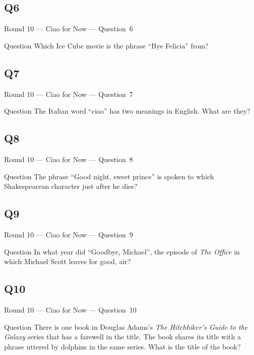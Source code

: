 \documentclass[11pt]{beamer}
\begin{document}
\subsection*{Q6}
\begin{frame}[t]{Round 10 --- Ciao for Now --- \mbox{Question 6}}
\vspace{-0.5em}
\begin{block}{Question}
Which Ice Cube movie is the phrase ``Bye Felicia'' from?
\end{block}
\end{frame}
\subsection*{Q7}
\begin{frame}[t]{Round 10 --- Ciao for Now --- \mbox{Question 7}}
\vspace{-0.5em}
\begin{block}{Question}
The Italian word ``ciao'' has two meanings in English. What are they? 
\end{block}
\end{frame}
\subsection*{Q8}
\begin{frame}[t]{Round 10 --- Ciao for Now --- \mbox{Question 8}}
\vspace{-0.5em}
\begin{block}{Question}
The phrase ``Good night, sweet prince'' is spoken to which Shakespearean character just after he dies?
\end{block}
\end{frame}
\subsection*{Q9}
\begin{frame}[t]{Round 10 --- Ciao for Now --- \mbox{Question 9}}
\vspace{-0.5em}
\begin{block}{Question}
In what year did ``Goodbye, Michael'', the episode of \emph{The Office} in which Michael Scott leaves for good, air?
\end{block}
\end{frame}
\subsection*{Q10}
\begin{frame}[t]{Round 10 --- Ciao for Now --- \mbox{Question 10}}
\vspace{-0.5em}
\begin{block}{Question}
There is one book in Douglas Adams's \emph{The Hitchhiker's Guide to the Galaxy} series that has a farewell in the title.  The book shares its title with a phrase uttered by dolphins in the same series. What is the title of the book?
\end{block}
\end{frame}
\end{document}
